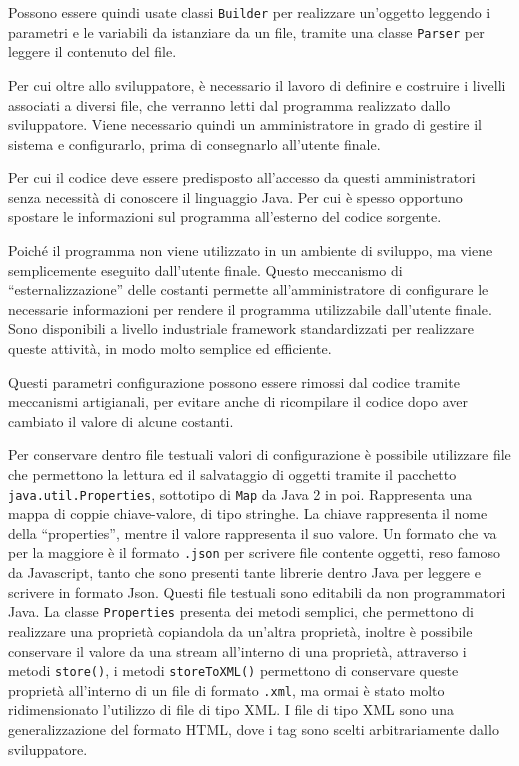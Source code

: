 \documentclass{article}
\numberwithin{equation}{subsection}
\begin{document}

Possono essere quindi usate classi \verb|Builder| per realizzare un'oggetto leggendo i parametri e le variabili da istanziare da un file, tramite una classe \verb|Parser| per 
leggere il contenuto del file. 

Per cui oltre allo sviluppatore, è necessario il lavoro di definire e costruire i livelli associati a diversi file, che verranno letti dal programma realizzato dallo 
sviluppatore. Viene necessario quindi un amministratore in grado di gestire il sistema e configurarlo, prima di consegnarlo all'utente finale. 

Per cui il codice deve essere predisposto all'accesso da questi amministratori senza necessità di conoscere il linguaggio Java. Per cui è spesso opportuno spostare le informazioni 
sul programma all'esterno del codice sorgente. 

Poiché il programma non viene utilizzato in un ambiente di sviluppo, ma viene semplicemente eseguito dall'utente finale. 
Questo meccanismo di ``esternalizzazione'' delle costanti permette all'amministratore di configurare le necessarie informazioni per rendere il programma utilizzabile dall'utente 
finale. 
Sono disponibili a livello industriale framework standardizzati per realizzare queste attività, in modo molto semplice ed efficiente. 

Questi parametri configurazione possono essere rimossi dal codice tramite meccanismi artigianali, per evitare anche di ricompilare il codice dopo aver cambiato il valore di 
alcune costanti. 


Per conservare dentro file testuali valori di configurazione è possibile utilizzare file che permettono la lettura ed il salvataggio di oggetti tramite il pacchetto \verb|java.util.Properties|, 
sottotipo di \verb|Map| da Java 2 in poi. Rappresenta una mappa di coppie chiave-valore, di tipo stringhe. La chiave rappresenta il nome della ``properties'', mentre il valore 
rappresenta il suo valore. 
Un formato che va per la maggiore è il formato \verb|.json| per scrivere file contente oggetti, reso famoso da Javascript, tanto che sono presenti tante librerie dentro 
Java per leggere e scrivere in formato Json. 
Questi file testuali sono editabili da non programmatori Java. 
La classe \verb|Properties| presenta dei metodi semplici, che permettono di realizzare una proprietà copiandola da un'altra proprietà, inoltre è possibile conservare il valore 
da una stream all'interno di una proprietà, attraverso i metodi \verb|store()|, i metodi \verb|storeToXML()| permettono di conservare queste proprietà all'interno di un file 
di formato \verb|.xml|, ma ormai è stato molto ridimensionato l'utilizzo di file di tipo XML. 
I file di tipo XML sono una generalizzazione del formato HTML, dove i tag sono scelti arbitrariamente dallo sviluppatore. 
\end{document}
